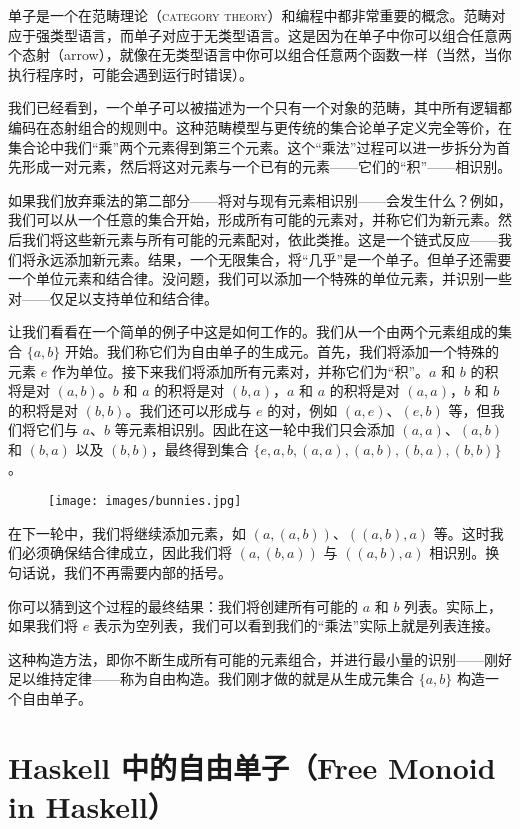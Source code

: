 
\lettrine[lhang=0.17]{单}{子是一个在范畴理论（category theory）和编程中都非常重要的概念}。范畴对应于强类型语言，而单子对应于无类型语言。这是因为在单子中你可以组合任意两个态射（arrow），就像在无类型语言中你可以组合任意两个函数一样（当然，当你执行程序时，可能会遇到运行时错误）。

我们已经看到，一个单子可以被描述为一个只有一个对象的范畴，其中所有逻辑都编码在态射组合的规则中。这种范畴模型与更传统的集合论单子定义完全等价，在集合论中我们“乘”两个元素得到第三个元素。这个“乘法”过程可以进一步拆分为首先形成一对元素，然后将这对元素与一个已有的元素——它们的“积”——相识别。

如果我们放弃乘法的第二部分——将对与现有元素相识别——会发生什么？例如，我们可以从一个任意的集合开始，形成所有可能的元素对，并称它们为新元素。然后我们将这些新元素与所有可能的元素配对，依此类推。这是一个链式反应——我们将永远添加新元素。结果，一个无限集合，将“几乎”是一个单子。但单子还需要一个单位元素和结合律。没问题，我们可以添加一个特殊的单位元素，并识别一些对——仅足以支持单位和结合律。

让我们看看在一个简单的例子中这是如何工作的。我们从一个由两个元素组成的集合 $\{a, b\}$ 开始。我们称它们为自由单子的生成元。首先，我们将添加一个特殊的元素 $e$ 作为单位。接下来我们将添加所有元素对，并称它们为“积”。$a$ 和 $b$ 的积将是对 $(a, b)$。$b$ 和 $a$ 的积将是对 $(b, a)$，$a$ 和 $a$ 的积将是对 $(a, a)$，$b$ 和 $b$ 的积将是对 $(b, b)$。我们还可以形成与 $e$ 的对，例如 $(a, e)$、$(e, b)$ 等，但我们将它们与 $a$、$b$ 等元素相识别。因此在这一轮中我们只会添加 $(a, a)$、$(a, b)$ 和 $(b, a)$ 以及 $(b, b)$，最终得到集合 $\{e, a, b, (a, a), (a, b), (b, a), (b, b)\}$。

\begin{figure}[H]
  \centering
  \texttt{[image: images/bunnies.jpg]}
\end{figure}

\noindent
在下一轮中，我们将继续添加元素，如 $(a, (a, b))$、$((a, b), a)$ 等。这时我们必须确保结合律成立，因此我们将 $(a, (b, a))$ 与 $((a, b), a)$ 相识别。换句话说，我们不再需要内部的括号。

你可以猜到这个过程的最终结果：我们将创建所有可能的 $a$ 和 $b$ 列表。实际上，如果我们将 $e$ 表示为空列表，我们可以看到我们的“乘法”实际上就是列表连接。

这种构造方法，即你不断生成所有可能的元素组合，并进行最小量的识别——刚好足以维持定律——称为自由构造。我们刚才做的就是从生成元集合 $\{a, b\}$ 构造一个自由单子。

\section{Haskell 中的自由单子（Free Monoid in Haskell）}

